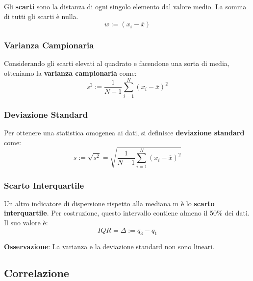 Gli \textbf{scarti} sono la distanza di ogni singolo elemento dal valore medio. La somma di tutti gli scarti è nulla. $$w:= (x_i - \overline{x})$$ 

\subsubsection{Varianza Campionaria}

Considerando gli scarti elevati al quadrato e facendone una sorta di media, otteniamo la \textbf{varianza campionaria} come: $$ s^2 := \dfrac{1}{N-1} \sum_{i=1}^N(x_i - \overline{x})^2 $$ 

\subsubsection{Deviazione Standard}

Per ottenere una statistica omogenea ai dati, si definisce \textbf{deviazione standard} come: $$ s := \sqrt{s^2} = \sqrt{\dfrac{1}{N-1} \sum_{i=1}^N(x_i - \overline{x})^2}$$ 

\subsubsection{Scarto Interquartile}

Un altro indicatore di dispersione rispetto alla mediana m è lo \textbf{scarto interquartile}. Per costruzione, questo intervallo contiene almeno il 50\% dei dati. Il suo valore è: $$ IQR = \Delta := q_3 - q_1$$  \newline

\noindent \textbf{Osservazione}: La varianza e la deviazione standard non sono lineari. \newline 


\subsection{Correlazione}

